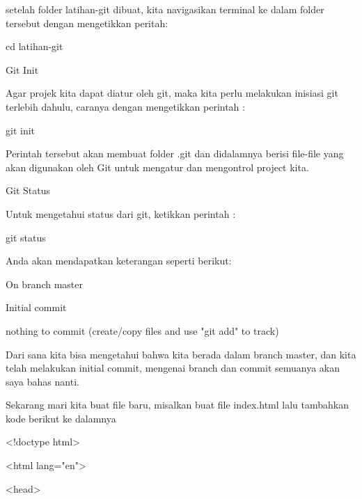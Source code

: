 \noindent 
setelah folder latihan-git dibuat, kita navigasikan terminal ke dalam folder tersebut dengan mengetikkan peritah: \par
\noindent 
 \hspace*{0.5in} cd latihan-git \par
\noindent 
 \hspace*{0.5in} Git Init \par
\noindent 
Agar projek kita dapat diatur oleh git, maka kita perlu melakukan inisiasi git terlebih dahulu, caranya dengan mengetikkan perintah : \par
\noindent 
 \hspace*{0.5in} git init \par
\noindent 
Perintah tersebut akan membuat folder .git dan didalamnya berisi file-file yang akan digunakan oleh Git untuk mengatur dan mengontrol project kita. \par
\noindent 
 \hspace*{0.5in} Git Status \par
\noindent 
Untuk mengetahui status dari git, ketikkan perintah : \par
\noindent 
 \hspace*{0.5in} git status \par
\noindent 
Anda akan mendapatkan keterangan seperti berikut: \par
\noindent 
 \hspace*{0.5in} On branch master \par
\noindent 
 \hspace*{0.5in} Initial commit \par
\noindent 
 \hspace*{0.5in} nothing to commit (create/copy files and use "git add" to track) \par
\noindent 
Dari sana kita bisa mengetahui bahwa kita berada dalam branch master, dan kita telah melakukan initial commit, mengenai branch dan commit semuanya akan saya bahas nanti. \par
\noindent 
Sekarang mari kita buat file baru, misalkan buat file index.html lalu tambahkan kode berikut ke dalamnya \par
\noindent 
 \hspace*{0.5in} <!doctype html> \par
\noindent 
 \hspace*{0.5in} <html lang="en"> \par
\noindent 
 \hspace*{0.5in} <head> \par
